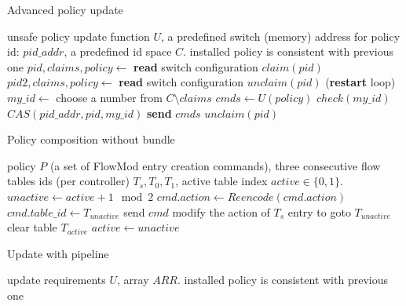 \documentclass[conference]{sigcomm-alternate}
\newcommand{\claimcheck}{check\xspace}
\begin{document}
\begin{algorithm}[t]
    \caption{Advanced policy update}
    \label{alg:update}
    \begin{algorithmic}[1]
        \Require unsafe policy update function $U$, a predefined switch (memory) address for policy id: $pid\_addr$, a predefined id space $C$.
    \Ensure installed policy is consistent with previous one
 		\Repeat
		 	\State $pid,claims,policy\gets$ \textbf{read} switch configuration
 			\State $claim(pid)$
 			\State $pid2,claims,policy\gets$ \textbf{read} switch configuration
	 			\State $unclaim(pid)$
 				 (\textbf{restart} loop)
 			\EndIf
 			\State $my\_id\gets$ choose a number from $C\setminus claims$
 			\State $cmds\gets U(policy)$
 			\startTxn
 				\State $\claimcheck(my\_id)$
	 			\State $CAS(pid\_addr, pid,my\_id)$
	 			\State \textbf{send} $cmds$ %
 			\endTxn
	 		\State $unclaim(pid)$
			\Return

    \end{algorithmic}
\end{algorithm}


\begin{algorithm}[t]
    \caption{Policy composition without bundle}
    \label{alg:wobundle}
    \begin{algorithmic}[1]
    \Require policy $P$ (a set of FlowMod entry creation commands), three consecutive flow tables ids (per controller) $T_s,T_0,T_1$, active table index $active\in\{0,1\}$.
    \State $unactive \gets active + 1 \mod{2}$
	    \State $cmd.action\gets Reencode(cmd.action)$
	    \State $cmd.table\_id\gets T_{unactive}$
	    \State send $cmd$
    \EndFor
    \State modify the action of $T_s$ entry to goto $T_{unactive}$
    \State clear table $T_{active}$
    \State $active \gets unactive$
	\Return

    \end{algorithmic}
\end{algorithm}

\begin{algorithm}[t]
    \caption{Update with pipeline}
    \label{alg:pipeline}
    \begin{algorithmic}[1]
    \Require update requirements $U$, array $ARR$.
    \Ensure installed policy is consistent with previous one
			\Return

    \end{algorithmic}
\end{algorithm}
\end{document}

